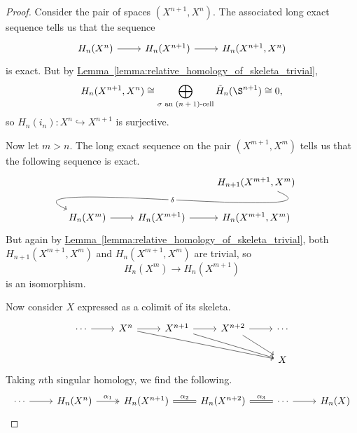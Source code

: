 \documentclass[main.tex]{subfiles}
\begin{document}
\begin{proof}
  Consider the pair of spaces $(X^{n+1}, X^{n})$. The associated long exact sequence tells us that the sequence
  \begin{equation*}
    \begin{tikzcd}
      H_{n}(X^{n})
      \arrow[r]
      & H_{n}(X^{n+1})
      \arrow[r]
      & H_{n}(X^{n+1},X^{n})
    \end{tikzcd}
  \end{equation*}
  is exact. But by \hyperref[lemma:relative_homology_of_skeleta_trivial]{Lemma~\ref*{lemma:relative_homology_of_skeleta_trivial}},
  \begin{equation*}
    H_{n}(X^{n+1},X^{n}) \cong \bigoplus_{\sigma \text{ an $(n+1)$-cell}} \tilde{H}_{n}(\S^{n+1}) \cong 0,
  \end{equation*}
  so $H_{n}(i_{n})\colon X^{n} \hookrightarrow X^{n+1}$ is surjective.

  Now let $m > n$. The long exact sequence on the pair $(X^{m+1}, X^{m})$ tells us that the following sequence is exact.
  \begin{equation*}
    \begin{tikzcd}
      && H_{n+1}(X^{m+1}, X^{m})
      \\
      H_{n}(X^{m})
      \arrow[from=urr, out=-22, in=157, looseness=1, overlay, "\delta" description]
      \arrow[r]
      & H_{n}(X^{m+1})
      \arrow[r]
      & H_{n}(X^{m+1}, X^{m})
    \end{tikzcd}
  \end{equation*}
  But again by \hyperref[lemma:relative_homology_of_skeleta_trivial]{Lemma~\ref*{lemma:relative_homology_of_skeleta_trivial}}, both $H_{n+1}(X^{m+1}, X^{m})$ and $H_{n}(X^{m+1}, X^{m})$ are trivial, so
  \begin{equation*}
    H_{n}(X^{m}) \to H_{n}(X^{m+1})
  \end{equation*}
  is an isomorphism.

  Now consider $X$ expressed as a colimit of its skeleta.
  \begin{equation*}
    \begin{tikzcd}
      \cdots
      \arrow[r]
      & X^{n}
      \arrow[r]
      \arrow[drrr]
      & X^{n+1}
      \arrow[r]
      \arrow[drr]
      & X^{n+2}
      \arrow[r]
      \arrow[dr]
      & \cdots
      \\
      &&&& X
    \end{tikzcd}
  \end{equation*}
  Taking $n$th singular homology, we find the following.
  \begin{equation*}
    \begin{tikzcd}
      \cdots
      \arrow[r]
      & H_{n}(X^{n})
      \arrow[r, two heads, "\alpha_{1}"]
      & H_{n}(X^{n+1})
      \arrow[r, equals, "\alpha_{2}"]
      & H_{n}(X^{n+2})
      \arrow[r, equals, "\alpha_{3}"]
      & \cdots
      \arrow[r,]
      & H_{n}(X)
    \end{tikzcd}
  \end{equation*}


\end{proof}
\end{document}
